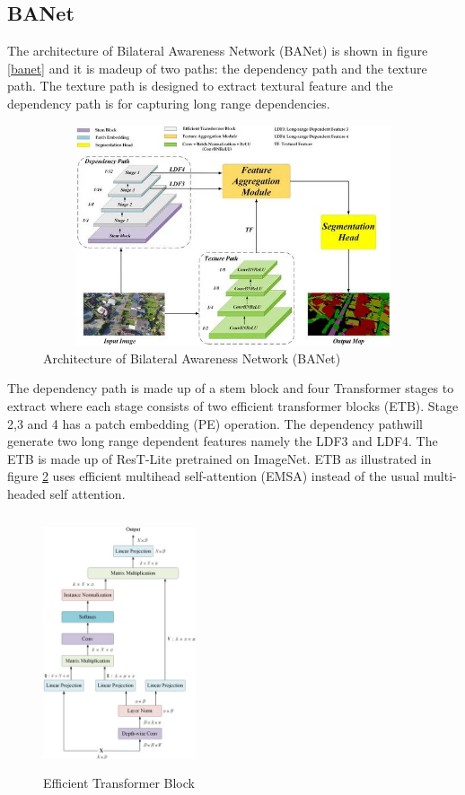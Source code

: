 \subsection{BANet}
The architecture of Bilateral Awareness Network (BANet) is shown in figure \ref{banet} and it is madeup of two paths: the dependency path and the texture path. The texture path is designed to extract textural feature and the dependency path is for capturing long range dependencies.

\FloatBarrier
\begin{figure}[ht]
\includegraphics[width=12.5cm, height=6.5cm]{images/banet.jpg}
\centering
\caption{Architecture of Bilateral Awareness Network (BANet) \protect\cite{banet}}
\label{fig:banet}
\end{figure}

The dependency path is made up of a stem block and four Transformer stages to extract where each stage consists of two efficient transformer blocks (ETB). Stage 2,3 and 4 has a patch embedding (PE) operation. The dependency pathwill generate two long range dependent features namely the LDF3 and LDF4. The ETB is made up of ResT-Lite \cite{restlite} pretrained on ImageNet. ETB as illustrated in figure \ref{fig:etb} uses efficient multihead self-attention (EMSA) instead of the usual multi-headed self attention.

\FloatBarrier
\begin{figure}[ht]
\includegraphics[width=4.5cm, height=7.5cm]{images/etb.png}
\centering
\caption{Efficient Transformer Block \protect\cite{banet}}
\label{fig:etb}
\end{figure}


